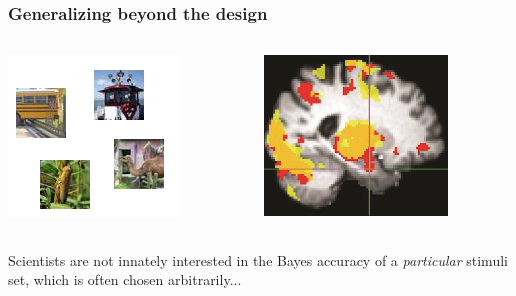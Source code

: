 \documentclass{beamer}
\begin{document}
\begin{frame}
\frametitle{Generalizing beyond the design}

\begin{columns}
\begin{column}{0.6\textwidth}
\begin{center}
\includegraphics[scale = 1]{imagenet_sub.png}
\end{center}
\end{column}
\begin{column}{0.4\textwidth}
\includegraphics[scale = 0.5]{smbrain2.png}
\end{column}
\end{columns}

Scientists are not innately interested in the Bayes accuracy of a \emph{particular} stimuli set, which is often chosen arbitrarily...

\end{frame}
\end{document}
